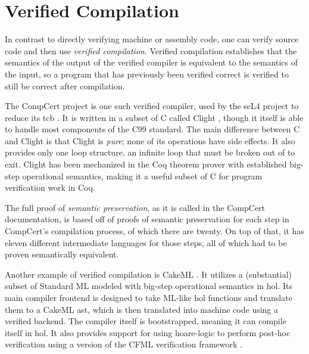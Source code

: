 \section{Verified Compilation}\label{se:verified}
In contrast to directly verifying machine or assembly code,
one can verify source code and then use \emph{verified compilation}.%
Verified compilation establishes that
the semantics of the output of the verified compiler
is equivalent to the semantics of the input,
so a program that has previously been verified correct
is verified to still be correct after compilation.

The CompCert project is one such verified compiler,
used by the seL4 project to reduce its \ac{tcb} \autocite{Klein_AEMSKH_14}.
It is written in a subset of C
called Clight \autocite{leroy:compcert,blazy2009clight},
though it itself is able to handle most components of the C99 standard.
The main difference between C and Clight is that Clight is \emph{pure};
none of its operations have side effects. It also provides only one loop structure,
an infinite loop that must be broken out of to exit.
Clight has been mechanized in the Coq theorem prover with established
big-step operational semantics, making it a useful subset of C
for program verification work in Coq.

The full proof of \emph{semantic preservation},
as it is called in the CompCert documentation,
is based off of proofs of semantic preservation
for each step in CompCert's compilation process, of which there are twenty.
On top of that, it has eleven different intermediate languages for those steps,
all of which had to be proven semantically equivalent.

Another example of verified compilation is CakeML \autocite{kumar2014cakeml}.
It utilizes a (substantial)
subset of Standard ML modeled with big-step operational semantics in \ac{hol}.
Its main compiler frontend is designed to take ML-like \ac{hol} functions
and translate them to a CakeML \ac{ast}, which is then translated into machine code
using a verified backend. The compiler itself is bootstrapped,
meaning it can compile itself in \ac{hol}. It also provides support for using \gls{hoare-logic}
to perform post-hoc verification using a version of the CFML verification framework
\autocite{gueneau2017formulae,arthur2015union,chargueraud2011cfv}.

